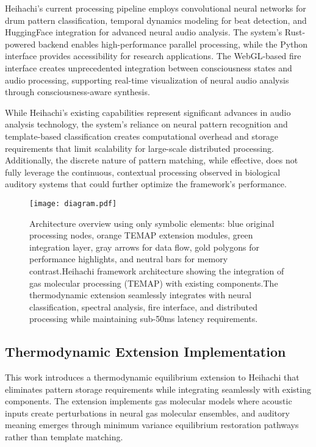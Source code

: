 \documentclass[12pt,a4paper]{article}
\begin{document}
Heihachi's current processing pipeline employs convolutional neural networks for drum pattern classification, temporal dynamics modeling for beat detection, and HuggingFace integration for advanced neural audio analysis. The system's Rust-powered backend enables high-performance parallel processing, while the Python interface provides accessibility for research applications. The WebGL-based fire interface creates unprecedented integration between consciousness states and audio processing, supporting real-time visualization of neural audio analysis through consciousness-aware synthesis.

While Heihachi's existing capabilities represent significant advances in audio analysis technology, the system's reliance on neural pattern recognition and template-based classification creates computational overhead and storage requirements that limit scalability for large-scale distributed processing. Additionally, the discrete nature of pattern matching, while effective, does not fully leverage the continuous, contextual processing observed in biological auditory systems that could further optimize the framework's performance.


\begin{figure}[h]
\centering
\texttt{[image: diagram.pdf]}
\caption{Architecture overview using only symbolic elements: blue original processing nodes, orange TEMAP extension modules, green integration layer, gray arrows for data flow, gold polygons for performance highlights, and neutral bars for memory contrast.Heihachi framework architecture showing the integration of gas molecular processing (TEMAP) with existing components.The thermodynamic extension seamlessly integrates with neural classification, spectral analysis, fire interface, and distributed processing while maintaining sub-50ms latency requirements.}
\label{fig:diagram}
\end{figure}



\subsection{Thermodynamic Extension Implementation}

This work introduces a thermodynamic equilibrium extension to Heihachi that eliminates pattern storage requirements while integrating seamlessly with existing components. The extension implements gas molecular models where acoustic inputs create perturbations in neural gas molecular ensembles, and auditory meaning emerges through minimum variance equilibrium restoration pathways rather than template matching.
\end{document}
